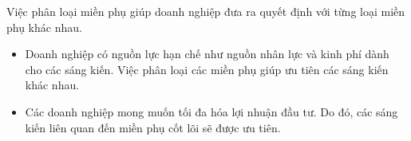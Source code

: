 Việc phân loại miền phụ giúp doanh nghiệp đưa ra quyết định với từng loại miền phụ khác nhau.

\begin{itemize}

\item Doanh nghiệp có nguồn lực hạn chế như nguồn nhân lực và kinh phí dành cho các sáng kiến. Việc phân loại các miền phụ giúp ưu tiên các sáng kiến khác nhau.

\item Các doanh nghiệp mong muốn tối đa hóa lợi nhuận đầu tư. Do đó, các sáng kiến liên quan đến miền phụ cốt lõi sẽ được ưu tiên.

\end{itemize}

